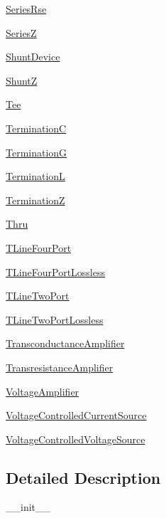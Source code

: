 \begin{DoxyCompactItemize}
\item 
 \hyperlink{namespaceSignalIntegrity_1_1Devices_1_1SeriesRse}{Series\+Rse}
\item 
 \hyperlink{namespaceSignalIntegrity_1_1Devices_1_1SeriesZ}{SeriesZ}
\item 
 \hyperlink{namespaceSignalIntegrity_1_1Devices_1_1ShuntDevice}{Shunt\+Device}
\item 
 \hyperlink{namespaceSignalIntegrity_1_1Devices_1_1ShuntZ}{ShuntZ}
\item 
 \hyperlink{namespaceSignalIntegrity_1_1Devices_1_1Tee}{Tee}
\item 
 \hyperlink{namespaceSignalIntegrity_1_1Devices_1_1TerminationC}{TerminationC}
\item 
 \hyperlink{namespaceSignalIntegrity_1_1Devices_1_1TerminationG}{TerminationG}
\item 
 \hyperlink{namespaceSignalIntegrity_1_1Devices_1_1TerminationL}{TerminationL}
\item 
 \hyperlink{namespaceSignalIntegrity_1_1Devices_1_1TerminationZ}{TerminationZ}
\item 
 \hyperlink{namespaceSignalIntegrity_1_1Devices_1_1Thru}{Thru}
\item 
 \hyperlink{namespaceSignalIntegrity_1_1Devices_1_1TLineFourPort}{T\+Line\+Four\+Port}
\item 
 \hyperlink{namespaceSignalIntegrity_1_1Devices_1_1TLineFourPortLossless}{T\+Line\+Four\+Port\+Lossless}
\item 
 \hyperlink{namespaceSignalIntegrity_1_1Devices_1_1TLineTwoPort}{T\+Line\+Two\+Port}
\item 
 \hyperlink{namespaceSignalIntegrity_1_1Devices_1_1TLineTwoPortLossless}{T\+Line\+Two\+Port\+Lossless}
\item 
 \hyperlink{namespaceSignalIntegrity_1_1Devices_1_1TransconductanceAmplifier}{Transconductance\+Amplifier}
\item 
 \hyperlink{namespaceSignalIntegrity_1_1Devices_1_1TransresistanceAmplifier}{Transresistance\+Amplifier}
\item 
 \hyperlink{namespaceSignalIntegrity_1_1Devices_1_1VoltageAmplifier}{Voltage\+Amplifier}
\item 
 \hyperlink{namespaceSignalIntegrity_1_1Devices_1_1VoltageControlledCurrentSource}{Voltage\+Controlled\+Current\+Source}
\item 
 \hyperlink{namespaceSignalIntegrity_1_1Devices_1_1VoltageControlledVoltageSource}{Voltage\+Controlled\+Voltage\+Source}
\end{DoxyCompactItemize}


\subsection{Detailed Description}
\begin{DoxyVerb}__init__\end{DoxyVerb}
 
